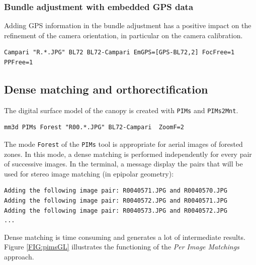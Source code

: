 \subsubsection{Bundle adjustment with embedded GPS data}

Adding GPS information in the bundle adjustment has a positive impact on the refinement of the camera orientation, in particular on the camera calibration.
\begin{verbatim}
Campari "R.*.JPG" BL72 BL72-Campari EmGPS=[GPS-BL72,2] FocFree=1 PPFree=1
\end{verbatim}

\subsection{Dense matching and orthorectification}

The digital surface model of the canopy is created with {\tt PIMs} and {\tt PIMs2Mnt}.

\begin{verbatim}
mm3d PIMs Forest "R00.*.JPG" BL72-Campari  ZoomF=2
\end{verbatim}

The mode {\tt Forest} of the {\tt PIMs} tool is appropriate for aerial images of forested zones. 
In this mode, a dense matching is performed independently for every pair of successive images.
In the terminal, a message display the pairs that will be used for stereo image matching (in epipolar geometry):
\begin{verbatim}
Adding the following image pair: R0040571.JPG and R0040570.JPG 
Adding the following image pair: R0040572.JPG and R0040571.JPG 
Adding the following image pair: R0040573.JPG and R0040572.JPG 
...
\end{verbatim}

Dense matching is time consuming and generates a lot of intermediate results.
Figure \ref{FIG:pimsGL} illustrates the functioning of the  \textit{Per Image Matchings} approach.

